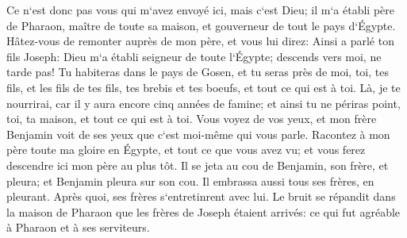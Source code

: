 \verse Ce n`est donc pas vous qui m`avez envoyé ici, mais c`est Dieu; il m`a établi père de Pharaon, maître de toute sa maison, et gouverneur de tout le pays d`Égypte. 
\verse Hâtez-vous de remonter auprès de mon père, et vous lui direz: Ainsi a parlé ton fils Joseph: Dieu m`a établi seigneur de toute l`Égypte; descends vers moi, ne tarde pas! 
\verse Tu habiteras dans le pays de Gosen, et tu seras près de moi, toi, tes fils, et les fils de tes fils, tes brebis et tes boeufs, et tout ce qui est à toi. 
\verse Là, je te nourrirai, car il y aura encore cinq années de famine; et ainsi tu ne périras point, toi, ta maison, et tout ce qui est à toi. 
\verse Vous voyez de vos yeux, et mon frère Benjamin voit de ses yeux que c`est moi-même qui vous parle. 
\verse Racontez à mon père toute ma gloire en Égypte, et tout ce que vous avez vu; et vous ferez descendre ici mon père au plus tôt. 
\verse Il se jeta au cou de Benjamin, son frère, et pleura; et Benjamin pleura sur son cou. 
\verse Il embrassa aussi tous ses frères, en pleurant. Après quoi, ses frères s`entretinrent avec lui. 
\verse Le bruit se répandit dans la maison de Pharaon que les frères de Joseph étaient arrivés: ce qui fut agréable à Pharaon et à ses serviteurs. 
